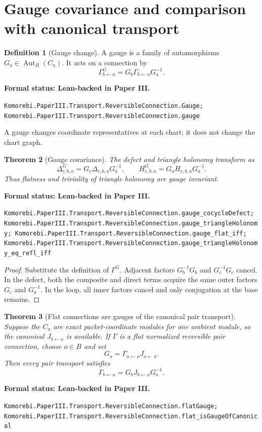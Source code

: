 \documentclass[11pt]{article}
\newtheorem{theorem}{Theorem}[section]
\theoremstyle{definition}
\newtheorem{definition}[theorem]{Definition}
\theoremstyle{remark}
\newcommand{\leanname}[1]{\nolinkurl{#1}}
\newcommand{\statusleanthree}[1]{%
  \par\smallskip\noindent
  {\color{leanblue}\textbf{Formal status: Lean-backed in Paper III.}}\par
  \begingroup\small\raggedright\leanname{#1}\par\endgroup\smallskip}
\begin{document}
\section{Gauge covariance and comparison with canonical transport}
\label{sec:gauge}

\begin{definition}[Gauge change]
\label{def:gauge-change}
A gauge is a family of automorphisms $G_a\in\operatorname{Aut}_R(C_a)$.
It acts on a connection by
\[
\Gamma^G_{b\leftarrow a}
=
G_b\Gamma_{b\leftarrow a}G_a^{-1}.
\]
\end{definition}
\statusleanthree{Komorebi.PaperIII.Transport.ReversibleConnection.Gauge; Komorebi.PaperIII.Transport.ReversibleConnection.gauge}

A gauge changes coordinate representatives at each chart; it does not change
the chart graph.

\begin{theorem}[Gauge covariance]
\label{thm:gauge-covariance}
The defect and triangle holonomy transform as
\[
\Delta^G_{c,b,a}
=G_c\Delta_{c,b,a}G_a^{-1},
\qquad
H^G_{c,b,a}
=G_aH_{c,b,a}G_a^{-1}.
\]
Thus flatness and triviality of triangle holonomy are gauge invariant.
\end{theorem}
\statusleanthree{Komorebi.PaperIII.Transport.ReversibleConnection.gauge_cocycleDefect; Komorebi.PaperIII.Transport.ReversibleConnection.gauge_triangleHolonomy; Komorebi.PaperIII.Transport.ReversibleConnection.gauge_flat_iff; Komorebi.PaperIII.Transport.ReversibleConnection.gauge_triangleHolonomy_eq_refl_iff}

\begin{proof}
Substitute the definition of $\Gamma^G$.  Adjacent factors
$G_b^{-1}G_b$ and $G_c^{-1}G_c$ cancel.  In the defect, both the composite
and direct terms acquire the same outer factors $G_c$ and $G_a^{-1}$.  In
the loop, all inner factors cancel and only conjugation at the base remains.
\end{proof}

\begin{theorem}[Flat connections are gauges of the canonical pair transport]
\label{thm:flat-gauge-canonical}
Suppose the $C_a$ are exact packet-coordinate modules for one ambient module,
so the canonical $J_{b\leftarrow a}$ is available.  If $\Gamma$ is a flat
normalized reversible pair connection, choose $o\in B$ and set
\[
G_a=\Gamma_{a\leftarrow o}J_{o\leftarrow a}.
\]
Then every pair transport satisfies
\[
\boxed{
\Gamma_{b\leftarrow a}
=G_bJ_{b\leftarrow a}G_a^{-1}.
}
\]
\end{theorem}
\statusleanthree{Komorebi.PaperIII.Transport.ReversibleConnection.flatGauge; Komorebi.PaperIII.Transport.ReversibleConnection.flat_isGaugeOfCanonical}
\end{document}

